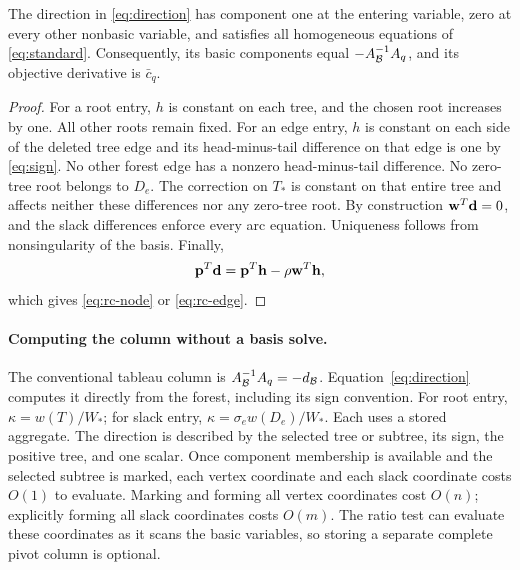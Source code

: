 \begin{proposition}
\label{prop:direction}
The direction in \eqref{eq:direction} has component one at the entering
variable, zero at every other nonbasic variable, and satisfies all homogeneous
equations of \eqref{eq:standard}. Consequently, its basic components equal
$-A_{\mathcal B}^{-1}A_q$, and its objective derivative is $\bar c_q$.
\end{proposition}
\begin{proof}
For a root entry, $h$ is constant on each tree, and the chosen root
increases by one. All other roots remain fixed. For an edge entry, $h$
is constant on each side of the deleted tree edge and its head-minus-tail
difference on that edge is one by \eqref{eq:sign}. No other forest edge has
a nonzero head-minus-tail difference. No zero-tree root belongs to $D_e$.
The correction on $T_*$ is constant on that entire tree and affects neither
these differences nor any zero-tree root. By construction $\mathbf{w}^T\mathbf{d}=0$, and
the slack differences enforce every arc equation. Uniqueness follows from
nonsingularity of the basis. Finally,
\[
 \mathbf{p}^T\mathbf{d}=\mathbf{p}^T\mathbf{h}-\rho \mathbf{w}^T\mathbf{h},
\]
which gives \eqref{eq:rc-node} or \eqref{eq:rc-edge}.
\end{proof}

\paragraph{Computing the column without a basis solve.}
The conventional tableau column is $A_{\mathcal B}^{-1}A_q=-d_{\mathcal B}$.
Equation~\eqref{eq:direction} computes it directly from the forest, including
its sign convention. For root entry, $\kappa=w(T)/W_*$; for slack entry,
$\kappa=\sigma_e w(D_e)/W_*$. Each uses a stored aggregate.
The direction is described by the selected tree or subtree, its sign, the
positive tree, and one scalar. Once component membership is available and
the selected subtree is marked, each vertex coordinate and each slack
coordinate costs $O(1)$ to evaluate. Marking and forming all vertex coordinates
cost $O(n)$; explicitly forming all slack coordinates costs $O(m)$.
The ratio test can evaluate these coordinates as it scans the basic variables,
so storing a separate complete pivot column is optional.

